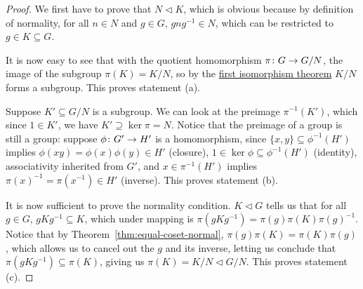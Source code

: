 \begin{proof}
    We first have to prove that \(N \lhd K\),
    which is obvious because by definition of normality,
    for all \(n \in N\) and \(g \in G\),
    \(gng^{-1} \in N\), which can be restricted to \(g \in K \subseteq G\).

    It is now easy to see that
    with the quotient homomorphism \(\pi\colon G\to G/N\),
    the image of the subgroup \(\pi(K) = K/N\),
    so by the \hyperref[thm:iso-1-group]{first isomorphism theorem}
    \(K/N\) forms a subgroup.
    This proves statement (a).


    \medskip

    Suppose \(K' \subseteq G/N\) is a subgroup.
    We can look at the preimage \(\pi^{-1}(K')\),
    which since \(1 \in K'\), we have \(K' \supseteq \ker\pi = N\).
    Notice that the preimage of a group is still a group:
    suppose \(\phi\colon G'\to H'\) is a homomorphism,
    since \(\{x,y\}\subseteq\phi^{-1}(H')\)
    implies \(\phi(xy) = \phi(x)\phi(y) \in H'\) (closure),
    \(1 \in \ker\phi \subseteq \phi^{-1}(H')\) (identity),
    associativity inherited from \(G'\),
    and \(x \in \pi^{-1}(H')\)
    implies \({\pi(x)}^{-1} = \pi(x^{-1}) \in H'\) (inverse).
    This proves statement (b).

    \medskip

    It is now sufficient to prove the normality condition.
    \(K \lhd G\) tells us that for all \(g \in G\), \(gKg^{-1} \subseteq K\),
    which under mapping is \(\pi(gKg^{-1}) = \pi(g)\pi(K){\pi(g)}^{-1}\).
    Notice that by Theorem~\ref{thm:equal-coset-normal},
    \(\pi(g)\pi(K) = \pi(K)\pi(g)\),
    which allows us to cancel out the \(g\) and its inverse,
    letting us conclude that \(\pi(gKg^{-1}) \subseteq \pi(K)\),
    giving us \(\pi(K) = K/N \lhd G/N\).
    This proves statement (c).


\end{proof}
